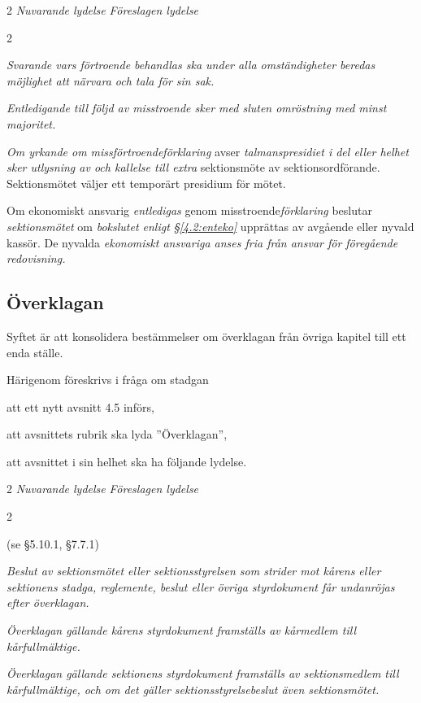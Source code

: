 \documentclass{article}
\newenvironment{lydelse}
    {\begin{paracol}{2}%
        \emph{Nuvarande lydelse}%
        \switchcolumn%
        \emph{Föreslagen lydelse}%
    \end{paracol}%
    \begin{enumerate}[label=\thesubsection.\arabic*]%
    \begin{paracol}{2}%
    }{\end{paracol}\end{enumerate}}
\begin{document}
\begin{lydelse}
    \item \emph{Svarande vars förtroende behandlas ska under alla omständigheter beredas möjlighet att närvara och tala för sin sak.}

    \item \emph{Entledigande till följd av misstroende sker med sluten omröstning med minst  majoritet.} \label{maj:mi} 
     
    \item \emph{Om yrkande om missförtroendeförklaring} avser \emph{talmanspresidiet i del eller helhet sker utlysning av och kallelse till extra} sektionsmöte av sektionsordförande.
      Sektionsmötet väljer ett temporärt presidium för mötet.
    
    \item Om ekonomiskt ansvarig \emph{entledigas} genom misstroende\emph{förklaring} beslutar \emph{sektionsmötet} om \emph{bokslutet enligt \S\ref{4.2:enteko}} upprättas av avgående eller nyvald kassör. De nyvalda \emph{ekonomiskt ansvariga anses fria från ansvar för föregående redovisning.}
\end{lydelse}
\setcounter{subsection}{4}    

\subsection{Överklagan}
Syftet är att konsolidera bestämmelser om överklagan från övriga kapitel till ett enda ställe.

Härigenom föreskrivs i fråga om stadgan
\begin{dels}
  \item att ett nytt avsnitt 4.5 införs,
  \item att avsnittets rubrik ska lyda ''Överklagan'',
  \item att avsnittet i sin helhet ska ha följande lydelse.
\end{dels}

\begin{lydelse}
  \item[] (se \S 5.10.1, \S 7.7.1)
  
  \switchcolumn
  \item \emph{Beslut av sektionsmötet eller sektionsstyrelsen som strider mot kårens eller sektionens stadga, reglemente, beslut eller övriga styrdokument får undanröjas efter överklagan.}
  \item \emph{Överklagan gällande kårens styrdokument framställs av kårmedlem till kårfullmäktige.}
  \item \emph{Överklagan gällande sektionens styrdokument framställs av sektionsmedlem till kårfullmäktige, och om det gäller sektionsstyrelsebeslut även sektionsmötet.}
\end{lydelse}
\end{document}
